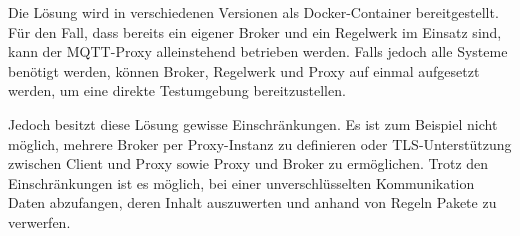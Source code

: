         Die Lösung wird in verschiedenen Versionen als Docker-Container bereitgestellt. Für den Fall, dass bereits ein eigener Broker und ein Regelwerk im Einsatz sind, kann der \ac{MQTT}-Proxy alleinstehend betrieben werden. Falls jedoch alle Systeme benötigt werden, können Broker, Regelwerk und Proxy auf einmal aufgesetzt werden, um eine direkte Testumgebung bereitzustellen.
        
        Jedoch besitzt diese Lösung gewisse Einschränkungen.
        Es ist zum Beispiel nicht möglich, mehrere Broker per Proxy-Instanz zu definieren oder \acs{TLS}-Unterstützung zwischen Client und Proxy sowie Proxy und Broker zu ermöglichen.
        Trotz den Einschränkungen ist es möglich, bei einer unverschlüsselten Kommunikation Daten abzufangen, deren Inhalt auszuwerten und anhand von Regeln Pakete zu verwerfen.
        
